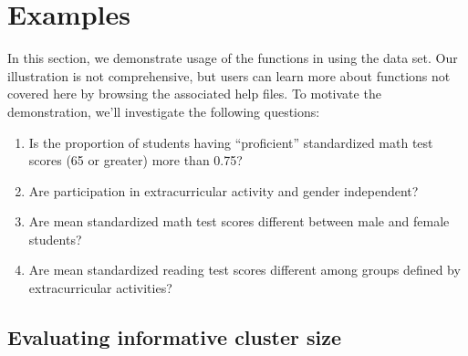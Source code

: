 \section{Examples} \label{s:examples}

In this section, we demonstrate usage of the functions in  using the  data set. Our illustration is not comprehensive, but users can learn more about functions not covered here by browsing the associated help files. To motivate the demonstration, we'll investigate the following questions:
\begin{enumerate}
	\item Is the proportion of students having ``proficient'' standardized math test scores (65 or greater) more than 0.75?
	\item Are participation in extracurricular activity and gender independent?
	\item Are mean standardized math test scores different between male and female students?
	\item Are mean standardized reading test scores different among groups defined by extracurricular activities?
\end{enumerate}

\subsection[Evaluating ICS]{Evaluating informative cluster size} \label{ss:icseval}

